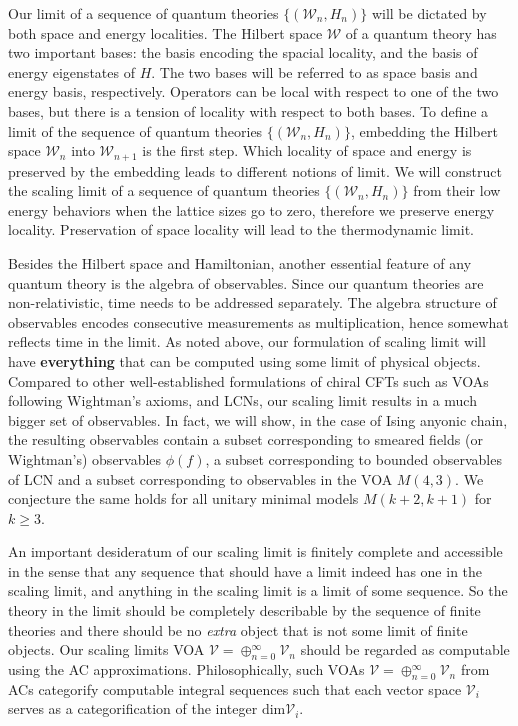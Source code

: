 \documentclass[twoside,11pt,titlepage]{amsart}
\renewcommand{\=}[1]{\stackrel{#1}{=}} %
\theoremstyle{definition}
\theoremstyle{remark}
\begin{document}
Our limit of a sequence of quantum theories $\{(\mathcal{W}_n,H_n)\}$ will be dictated by both space and energy localities.  The Hilbert space $\mathcal{W}$ of a quantum theory has two important bases: the basis encoding the spacial locality, and the basis of energy eigenstates of $H$. The two bases will be referred to as space basis and energy basis, respectively.  Operators can be local with respect to one of the two bases, but there is a tension of locality with respect to both bases.  To define a limit of the sequence of quantum theories $\{(\mathcal{W}_n,H_n)\}$, embedding the Hilbert space $\mathcal{W}_n$ into $\mathcal{W}_{n+1}$ is the first step.  Which locality of space and energy is preserved by the embedding leads to different notions of limit.  We will construct the scaling limit of a sequence of quantum theories $\{(\mathcal{W}_n,H_n)\}$ from their low energy behaviors when the lattice sizes go to zero, therefore we preserve energy locality.  Preservation of space locality will lead to the thermodynamic limit. 

Besides the Hilbert space and Hamiltonian, another essential feature of any quantum theory is the algebra of observables. Since our quantum theories are non-relativistic, time needs to be addressed separately.  The algebra structure of observables encodes consecutive measurements as multiplication, hence somewhat reflects time in the limit.  As noted above, our formulation of scaling limit will have \textbf{everything} that can be computed using some limit of physical objects. Compared to other well-established formulations of chiral CFTs such as VOAs following Wightman's axioms,  and LCNs, our scaling limit results in a much bigger set of observables. In fact, we will show, in the case of Ising anyonic chain, the resulting observables contain a subset corresponding to smeared fields (or Wightman's) observables $\phi(f)$, a subset corresponding to bounded observables of LCN and a subset corresponding to observables in the VOA $M(4,3)$. We conjecture the same holds for all unitary minimal models $M(k+2,k+1)$ for $k\geq 3$.

An important desideratum of our scaling limit is finitely complete and accessible in the sense that any sequence that should have a limit indeed has one in the scaling limit, and anything in the scaling limit is a limit of some sequence. So the theory in the limit should be completely describable by the sequence of finite theories and there should be no \textit{extra} object that is not some limit of finite objects.  Our scaling limits VOA $\mathcal{V}=\oplus_{n=0}^{\infty} \mathcal{V}_n$ should be regarded as computable using the AC approximations.  Philosophically, such VOAs $\mathcal{V}=\oplus_{n=0}^{\infty} \mathcal{V}_n$ from ACs categorify computable integral sequences such that each vector space $\mathcal{V}_i$ serves as a categorification of the integer $\textrm{dim} \mathcal{V}_i$. 
\end{document}

